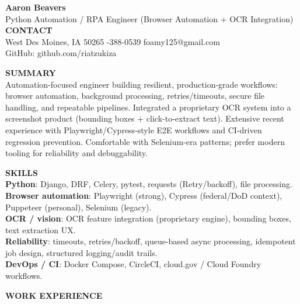\documentclass[10pt]{article}
\begin{document}
{\LARGE \textbf{Aaron Beavers}}\\
Python Automation / RPA Engineer (Browser Automation + OCR Integration)\\

\vspace{2pt}
\textbf{CONTACT}\\
West Des Moines, IA 50265 \;\;\textbar\;-388-0539 \;\;\textbar\;\; foamy125@gmail.com\\
GitHub: github.com/riatzukiza

\vspace{6pt}
\textbf{SUMMARY}\\
Automation-focused engineer building resilient, production-grade workflows: browser automation, background processing, retries/timeouts, secure file handling, and repeatable pipelines. Integrated a proprietary OCR system into a screenshot product (bounding boxes + click-to-extract text). Extensive recent experience with Playwright/Cypress-style E2E workflows and CI-driven regression prevention. Comfortable with Selenium-era patterns; prefer modern tooling for reliability and debuggability.

\vspace{2pt}
\textbf{SKILLS}\\
\textbf{Python}: Django, DRF, Celery, pytest, requests (Retry/backoff), file processing.\\
\textbf{Browser automation}: Playwright (strong), Cypress (federal/DoD context), Puppeteer (personal), Selenium (legacy).\\
\textbf{OCR / vision}: OCR feature integration (proprietary engine), bounding boxes, text extraction UX.\\
\textbf{Reliability}: timeouts, retries/backoff, queue-based async processing, idempotent job design, structured logging/audit trails.\\
\textbf{DevOps / CI}: Docker Compose, CircleCI, cloud.gov / Cloud Foundry workflows.

\vspace{6pt}
\textbf{WORK EXPERIENCE}\\
\end{document}
